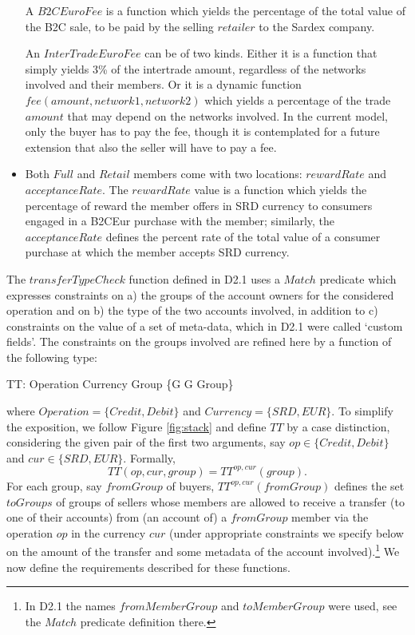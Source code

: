 \begin{itemize}
A $B2CEuroFee$ is a function which yields the percentage of the total value of the B2C sale, to be paid by the selling $retailer$ to the Sardex company. 

An $InterTradeEuroFee$ can be of two kinds. Either it is a function that simply yields 3\% of the intertrade amount, regardless of the networks involved and their members. Or it is a dynamic function $fee(amount, network1, network2)$ which yields a percentage of the trade $amount$ that may depend on the networks involved. In the current model, only the buyer has to pay the fee, though it is contemplated for a future extension that also the seller will have to pay a fee.

\item Both $Full$ and $Retail$ members come with two locations: $rewardRate$ and $acceptanceRate$. The $rewardRate$ value is a function which yields the percentage of reward the member offers in SRD currency to consumers engaged in a B2CEur purchase with the member; similarly, the $acceptanceRate$ defines the percent rate of the total value of a consumer purchase at which the member accepts SRD currency.

\end{itemize}

The $transferTypeCheck$ function defined in D2.1 uses a $Match$ predicate which expresses constraints on a) the groups of the account owners for the considered operation and on b) the type of the two accounts involved, in addition to c) constraints on the value of a set of meta-data, which in D2.1 were called `custom fields'. The constraints on the groups involved are refined here by a function of the following type:
\begin{asm}
TT: Operation \times Currency \times Group \rightarrow \{G \mid G \subseteq Group\}
\end{asm} 
\noindent where $Operation = \{Credit,Debit\}$ and $Currency =\{SRD,EUR\}$.
To simplify the exposition, we follow Figure \ref{fig:stack} and define $TT$ by a case distinction, considering the given pair of the first two arguments, say  $op \in \{Credit,Debit\}$ and $cur \in \{SRD,EUR\}$. Formally,
\[TT(op,cur,group)=TT^{op,cur}(group).\]
For each group, say $fromGroup$ of buyers, $TT^{op,cur}(fromGroup)$ defines the set $toGroups$ of groups
of sellers
whose members are allowed to receive a transfer (to one of their accounts) from (an account of) a 
$fromGroup$ member via the operation $op$ in the currency $cur$ (under appropriate constraints we specify below on the amount of the transfer and some metadata of the account involved).\footnote{In D2.1 the names $fromMemberGroup$ and $toMemberGroup$ were used, see the $Match$ predicate definition there.} We 
now define the requirements described for these functions.


